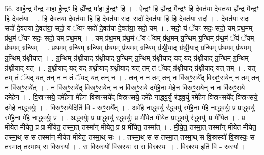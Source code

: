 \documentclass[17pt]{extarticle}
\begin{document}
56. आ॒है॒न्द्र मै॒न्द्र मा॑हा है॒न्द्रꣳ हि ह्यै᳚न्द्र मा॑हा है॒न्द्रꣳ हि । . ऐ॒न्द्रꣳ हि ह्यै᳚न्द्र मै॒न्द्रꣳ हि दे॒वत॑या दे॒वत॑या॒ ह्यै᳚न्द्र मै॒न्द्रꣳ हि दे॒वत॑या । . हि दे॒वत॑या दे॒वत॑या॒ हि हि दे॒वत॑या॒ सदः॒ सदो॑ दे॒वत॑या॒ हि हि दे॒वत॑या॒ सदः॑ । . दे॒वत॑या॒ सदः॒ सदो॑ दे॒वत॑या दे॒वत॑या॒ सदो॒ यं ॅयꣳ सदो॑ दे॒वत॑या दे॒वत॑या॒ सदो॒ यम् । . सदो॒ यं ॅयꣳ सदः॒ सदो॒ यम् प्र॑थ॒मम् प्र॑थ॒मं ॅयꣳ सदः॒ सदो॒ यम् प्र॑थ॒मम् । . यम् प्र॑थ॒मम् प्र॑थ॒मं ॅयं ॅयम् प्र॑थ॒मम् ग्र॒न्थिम् ग्र॒न्थिम् प्र॑थ॒मं ॅयं ॅयम् प्र॑थ॒मम् ग्र॒न्थिम् । . प्र॒थ॒मम् ग्र॒न्थिम् ग्र॒न्थिम् प्र॑थ॒मम् प्र॑थ॒मम् ग्र॒न्थिम् ग्र॑थ्नी॒याद् ग्र॑थ्नी॒याद् ग्र॒न्थिम् प्र॑थ॒मम् प्र॑थ॒मम् ग्र॒न्थिम् ग्र॑थ्नी॒यात् । . ग्र॒न्थिम् ग्र॑थ्नी॒याद् ग्र॑थ्नी॒याद् ग्र॒न्थिम् ग्र॒न्थिम् ग्र॑थ्नी॒याद् यद् यद् ग्र॑थ्नी॒याद् ग्र॒न्थिम् ग्र॒न्थिम् ग्र॑थ्नी॒याद् यत् । . ग्र॒थ्नी॒याद् यद् यद् ग्र॑थ्नी॒याद् ग्र॑थ्नी॒याद् यत् तम् तं ॅयद् ग्र॑थ्नी॒याद् ग्र॑थ्नी॒याद् यत् तम् । . यत् तम् तं ॅयद् यत् तन् न न तं ॅयद् यत् तन् न । . तन् न न तम् तन् न वि॑स्रꣳ॒॒सये᳚द् विस्रꣳ॒॒सये॒न् न तम् तन् न वि॑स्रꣳ॒॒सये᳚त् । . न वि॑स्रꣳ॒॒सये᳚द् विस्रꣳ॒॒सये॒न् न न वि॑स्रꣳ॒॒सये॒ दमे॑हे॒ना मे॑हेन विस्रꣳ॒॒सये॒न् न न वि॑स्रꣳ॒॒सये॒ दमे॑हेन । . वि॒स्रꣳ॒॒सये॒ दमे॑हे॒ना मे॑हेन विस्रꣳ॒॒सये᳚द् विस्रꣳ॒॒सये॒ दमे॑हे नाद्ध्व॒र्यु र॑द्ध्व॒र्यु रमे॑हेन विस्रꣳ॒॒सये᳚द् विस्रꣳ॒॒सये॒ दमे॑हे नाद्ध्व॒र्युः । . वि॒स्रꣳ॒॒सये॒दिति॑ वि - स्रꣳ॒॒सये᳚त् । . अमे॑हे नाद्ध्व॒र्यु र॑द्ध्व॒र्यु रमे॑हे॒ना मे॑हे नाद्ध्व॒र्युः प्र प्राद्ध्व॒र्यु रमे॑हे॒ना मे॑हे नाद्ध्व॒र्युः प्र । . अ॒द्ध्व॒र्युः प्र प्राद्ध्व॒र्यु र॑द्ध्व॒र्युः प्र मी॑येत मीयेत॒ प्राद्ध्व॒र्यु र॑द्ध्व॒र्युः प्र मी॑येत । . प्र मी॑येत मीयेत॒ प्र प्र मी॑येत॒ तस्मा॒त् तस्मा᳚न् मीयेत॒ प्र प्र मी॑येत॒ तस्मा᳚त् । . मी॒ये॒त॒ तस्मा॒त् तस्मा᳚न् मीयेत मीयेत॒ तस्मा॒थ् स स तस्मा᳚न् मीयेत मीयेत॒ तस्मा॒थ् सः । . तस्मा॒थ् स स तस्मा॒त् तस्मा॒थ् स वि॒स्रस्यो॑ वि॒स्रस्यः॒ स तस्मा॒त् तस्मा॒थ् स वि॒स्रस्यः॑ । . स वि॒स्रस्यो॑ वि॒स्रस्यः॒ स स वि॒स्रस्यः॑ । . वि॒स्रस्य॒ इति॑ वि - स्रस्यः॑ । \newline
\pagebreak
{}
\end{document}
